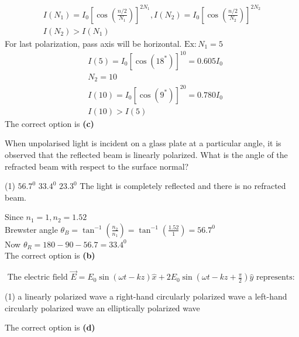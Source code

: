 \begin{enumerate}
\begin{tasks}
\end{tasks}
\begin{answer}
	$$
	\begin{gathered}
	I\left(N_{1}\right)=I_{0}\left[\cos \left(\frac{n / 2}{N_{1}}\right)\right]^{2 N_{1}}, I\left(N_{2}\right)=I_{0}\left[\cos \left(\frac{n / 2}{N_{2}}\right)\right]^{2 N_{2}} \\
	I\left(N_{2}\right)>I\left(N_{1}\right)
	\end{gathered}
	$$
	For last polarization, pass axis will be horizontal.
	$\mathrm{Ex}: N_{1}=5$
	$$
	\begin{aligned}
	&I(5)=I_{0}\left[\cos \left(18^{*}\right)\right]^{10}=0.605 I_{0} \\
	&N_{2}=10 \\
	&I(10)=I_{0}\left[\cos \left(9^{*}\right)\right]^{20}=0.780 I_{0} \\
	&I(10)>I(5)
	\end{aligned}
	$$
	The correct option is \textbf{(c)}	
\end{answer}
\begin{minipage}{\textwidth}
	\item When unpolarised light is incident on a glass plate at a particular angle, it is observed that the reflected beam is linearly polarized. What is the angle of the refracted beam with respect to the surface normal?
\end{minipage}
\begin{tasks}(1)
	\task[\textbf{A.}] $56.7^{0}$
	\task[\textbf{B.}]$33.4^{0}$
	\task[\textbf{C.}]$23.3^{0}$
	\task[\textbf{D.}]The light is completely reflected and there is no refracted beam.
\end{tasks}
\begin{answer}
	Since $n_{1}=1, n_{2}=1.52$\\
	Brewster angle $\theta_{B}=\tan ^{-1}\left(\frac{n_{2}}{n_{1}}\right)=\tan ^{-1}\left(\frac{1.52}{1}\right)=56.7^{0}$\\
	Now $\theta_{R}=180-90-56.7=33.4^{0}$\\
	The correct option is \textbf{(b)}	
\end{answer}
\begin{minipage}{\textwidth}
	\item $\text { The electric field } \vec{E}=E_{0} \sin (\omega t-k z) \hat{x}+2 E_{0} \sin \left(\omega t-k z+\frac{\pi}{2}\right) \hat{y} \text { represents: }$
\end{minipage}
\begin{tasks}(1)
	\task[\textbf{A.}] a linearly polarized wave
	\task[\textbf{B.}]a right-hand circularly polarized wave
	\task[\textbf{C.}]a left-hand circularly polarized wave
	\task[\textbf{D.}]an elliptically polarized wave
\end{tasks}
\begin{answer}
	The correct option is \textbf{(d)}
\end{answer}
\end{enumerate}
